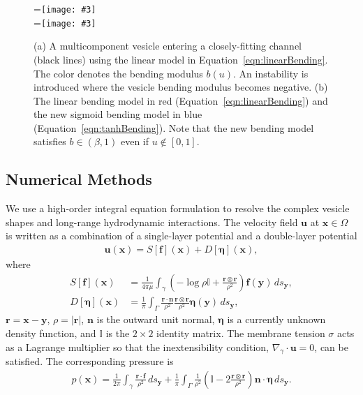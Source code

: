 \documentclass[twoside,twocolumn,9pt]{article}
\newcommand{\ff}{\mathbf{f}}
\newcommand{\eeta}{\boldsymbol{\eta}}
\newcommand{\nn}{\mathbf{n}}
\newcommand{\rr}{\mathbf{r}}
\newcommand{\uu}{\mathbf{u}}
\newcommand{\xx}{\mathbf{x}}
\newcommand{\yy}{\mathbf{y}}
\newcommand{\subfigimg}[3][,]{%
  \setbox1=\hbox{\texttt{[image: \#3]}}%
  \leavevmode\rlap{\usebox1}%
  \rlap{\hspace*{0pt}\raisebox{\dimexpr\ht1-0\baselineskip}{\bf
  \normalsize #2}}%
  \phantom{\usebox1}%
}
\begin{document}
\begin{figure}[h]
  \centering
  \subfigimg[width=0.9\linewidth, clip ]{(a)}{figures/OldBending.pdf} \\
  \subfigimg[width=0.9\linewidth, clip ]{(b)}{figures/concModels.pdf}
  \caption{\label{fig:concModels} \small (a) A multicomponent vesicle
  entering a closely-fitting channel (black lines) using the linear
  model in Equation~\eqref{eqn:linearBending}.  The color denotes the
  bending modulus $b(u)$.  An instability is introduced where the
  vesicle bending modulus becomes negative. (b) The linear bending model
  in red (Equation~\eqref{eqn:linearBending}) and the new sigmoid
  bending model in blue (Equation~\eqref{eqn:tanhBending}). Note that
  the new bending model satisfies $b \in (\beta,1)$ even if $u \notin
  [0,1]$.}
\end{figure}


\subsection{\label{sec:NumericalMethods}Numerical Methods}
We use a high-order integral equation formulation to resolve the complex
vesicle shapes and long-range hydrodynamic interactions. The velocity
field $\uu$ at $\xx \in \Omega$ is written as a combination of a
single-layer potential and a double-layer potential
\begin{align}
  \label{eqn:LPrep}
  \uu(\xx) = S[\ff](\xx) + D[\eeta](\xx),
\end{align}
where
\begin{align}
  S[\ff](\xx) &= \frac{1}{4\pi\mu} \int_{\gamma} \left(
    -\log \rho \mathds{I} + \frac{\rr \otimes \rr}{\rho^2} \right)
    \ff(\yy) \, ds_\yy, \\
%
    D[\eeta](\xx) &= \frac{1}{\pi} \int_{\Gamma} 
      \frac{\rr \cdot \nn}{\rho^2} 
      \frac{\rr \otimes \rr}{\rho^2} \eeta(\yy) \, ds_\yy,
\end{align}
$\rr = \xx - \yy$, $\rho = |\rr|$, $\nn$ is the outward unit normal,
$\eeta$ is a currently unknown density function, and $\mathds{I}$ is the
$2 \times 2$ identity matrix. The membrane tension $\sigma$ acts as a
Lagrange multiplier so that the inextensibility condition,
$\nabla_{\gamma} \cdot \uu = 0$, can be satisfied. The corresponding
pressure is
\begin{align}
  \label{eqn:pressure}
  p(\xx) = \frac{1}{2\pi} \int_{\gamma} \frac{\rr \cdot \ff}{\rho^2} \, ds_\yy + 
    \frac{1}{\pi} \int_{\Gamma} \frac{1}{\rho^2} 
    \left(\mathds{I} - 2\frac{\rr \otimes \rr}{\rho^2} \right) 
    \nn \cdot \eeta \, ds_\yy.
\end{align}
\end{document}
